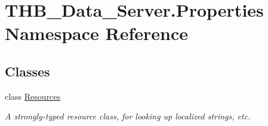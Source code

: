 \hypertarget{namespace_t_h_b___data___server_1_1_properties}{}\section{T\+H\+B\+\_\+\+Data\+\_\+\+Server.\+Properties Namespace Reference}
\label{namespace_t_h_b___data___server_1_1_properties}
\subsection*{Classes}
\begin{DoxyCompactItemize}
\item 
class \mbox{\hyperlink{class_t_h_b___data___server_1_1_properties_1_1_resources}{Resources}}
\begin{DoxyCompactList}\small\item\em A strongly-\/typed resource class, for looking up localized strings, etc. \end{DoxyCompactList}\end{DoxyCompactItemize}
